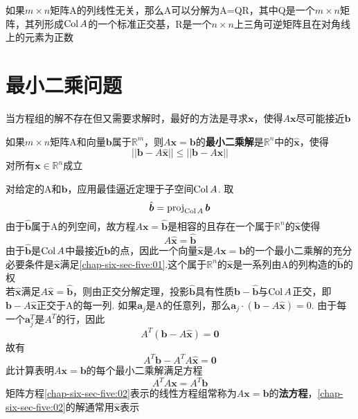 \begin{TheoremTwo}[QR分解]
如果$m\times n$矩阵A的列线性无关，那么A可以分解为A=QR，其中Q是一个$m\times n$矩阵，其列形成$\operatorname{Col} A$的一个标准正交基，R是一个$n\times n$上三角可逆矩阵且在对角线上的元素为正数
\end{TheoremTwo}\vspace{4ex}

\section{最小二乘问题}
当方程组的解不存在但又需要求解时，最好的方法是寻求$\bm{x}$，使得$A\bm{x}$尽可能接近$\bm{b}$\\[2ex]

\begin{definition}
如果$m\times n$矩阵A和向量$\bm{b}$属于$\mathbb{R}^m$，则$A\bm{x}=\bm{b}$的\textbf{最小二乘解}是$\mathbb{R}^n$中的$\hat{\bm{x}}$，使得
\[||\bm{b}-A\hat{\bm{x}}||\leqslant||\bm{b}-A\bm{x}||\]
对所有$\bm{x}\in\mathbb{R}^n$成立
\end{definition}\vspace{4ex}

对给定的A和$\bm{b}$，应用最佳逼近定理于子空间$\operatorname{Col} A$. 取
\[\hat{\bm{b}}=\operatorname{proj}_{\operatorname{Col} A}\bm{b}\]
由于$\hat{\bm{b}}$属于A的列空间，故方程$A\bm{x}=\hat{\bm{b}}$是相容的且存在一个属于$\mathbb{R}^n$的$\hat{\bm{x}}$使得
\begin{equation}
A\hat{\bm{x}}=\hat{\bm{b}}\label{chap-six-sec-five:01}
\end{equation}
由于$\hat{\bm{b}}$是$\operatorname{Col} A$中最接近$\bm{b}$的点，因此一个向量$\hat{\bm{x}}$是$A\bm{x}=\bm{b}$的一个最小二乘解的充分必要条件是$\hat{\bm{x}}$满足\eqref{chap-six-sec-five:01}.这个属于$\mathbb{R}^n$的$\hat{\bm{x}}$是一系列由A的列构造的$\hat{\bm{b}}$的权\\[2ex]

若$\hat{\bm{x}}$满足$A\hat{\bm{x}}=\hat{\bm{b}}$，则由正交分解定理，投影$\hat{\bm{b}}$具有性质$\bm{b}-\hat{\bm{b}}$与$\operatorname{Col} A$正交，即$\bm{b}-A\hat{\bm{x}}$正交于A的每一列. 如果$\bm{a}_j$是A的任意列，那么$\bm{a}_j\cdot(\bm{b}-A\hat{\bm{x}})=0$. 由于每一个$\bm{a}_j^T$是$A^T$的行，因此
\[A^T(\bm{b}-A\hat{\bm{x}})=\bm{0}\]
故有
\[A^T\bm{b}-A^TA\hat{\bm{x}}=\bm{0}\]
此计算表明$A\bm{x}=\bm{b}$的每个最小二乘解满足方程
\begin{equation}
A^TA\bm{x}=A^T\bm{b}\label{chap-six-sec-five:02}
\end{equation}
矩阵方程\eqref{chap-six-sec-five:02}表示的线性方程组常称为$A\bm{x}=\bm{b}$的\textbf{法方程}，\eqref{chap-six-sec-five:02}的解通常用$\hat{\bm{x}}$表示\\[2ex]

